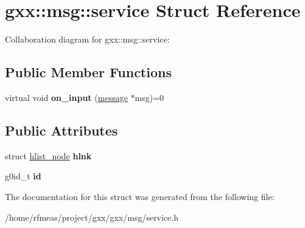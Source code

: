 \hypertarget{structgxx_1_1msg_1_1service}{}\section{gxx\+:\+:msg\+:\+:service Struct Reference}
\label{structgxx_1_1msg_1_1service}


Collaboration diagram for gxx\+:\+:msg\+:\+:service\+:
\subsection*{Public Member Functions}
\begin{DoxyCompactItemize}
\item 
virtual void {\bfseries on\+\_\+input} (\hyperlink{structgxx_1_1msg_1_1message}{message} $\ast$msg)=0\hypertarget{structgxx_1_1msg_1_1service_a32f1a10152b1de5af4238568a6ed22ff}{}\label{structgxx_1_1msg_1_1service_a32f1a10152b1de5af4238568a6ed22ff}

\end{DoxyCompactItemize}
\subsection*{Public Attributes}
\begin{DoxyCompactItemize}
\item 
struct \hyperlink{structhlist__node}{hlist\+\_\+node} {\bfseries hlnk}\hypertarget{structgxx_1_1msg_1_1service_a0c5a1ca732523fb33f798d0974b8f1ed}{}\label{structgxx_1_1msg_1_1service_a0c5a1ca732523fb33f798d0974b8f1ed}

\item 
g0id\+\_\+t {\bfseries id}\hypertarget{structgxx_1_1msg_1_1service_a1cecd36ce14ec94b889bf958366a90af}{}\label{structgxx_1_1msg_1_1service_a1cecd36ce14ec94b889bf958366a90af}

\end{DoxyCompactItemize}


The documentation for this struct was generated from the following file\+:\begin{DoxyCompactItemize}
\item 
/home/rfmeas/project/gxx/gxx/msg/service.\+h\end{DoxyCompactItemize}

